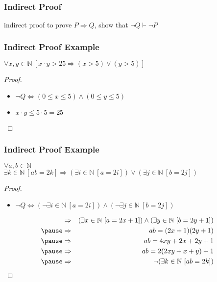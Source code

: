 \documentclass[dvipsnames]{beamer}
\begin{document}
\begin{frame}
  \frametitle{Indirect Proof}

  \begin{block}{indirect proof}
    to prove $P \Rightarrow Q$, show that $\neg Q \vdash \neg P$
  \end{block}
\end{frame}

\begin{frame}
  \frametitle{Indirect Proof Example}

  \begin{theorem}
    $\forall x,y \in \mathbb{N}~[x \cdot y > 25
      \Rightarrow (x > 5) \vee (y > 5)]$
  \end{theorem}

  \pause
  \begin{proof}
    \begin{itemize}
      \item $\neg Q \Leftrightarrow (0 \leq x \leq 5) \wedge (0 \leq y \leq 5)$

      \pause
      \item $x \cdot y \leq 5 \cdot 5 = 25$
    \end{itemize}
  \end{proof}
\end{frame}

\begin{frame}
  \frametitle{Indirect Proof Example}

  \begin{theorem}
    $\forall a,b \in \mathbb{N}$\\
      $\exists k \in \mathbb{N}~[ab=2k] \Rightarrow
        (\exists i \in \mathbb{N}~[a=2i]) \vee
        (\exists j \in \mathbb{N}~[b=2j])$
  \end{theorem}

  \pause
  \begin{proof}
    \begin{itemize}
      \item $\neg Q \Leftrightarrow (\neg \exists i \in \mathbb{N}~[a=2i])
                          \wedge (\neg \exists j \in \mathbb{N}~[b=2j])$
    \end{itemize}

    \pause
    \vspace{-24pt}
    \begin{eqnarray*}
      & \Rightarrow & (\exists x \in \mathbb{N}~[a=2x+1])
               \wedge (\exists y \in \mathbb{N}~[b=2y+1])\\\pause
      & \Rightarrow & ab=(2x+1)(2y+1)\\\pause
      & \Rightarrow & ab=4xy+2x+2y+1\\\pause
      & \Rightarrow & ab=2(2xy+x+y)+1\\\pause
      & \Rightarrow & \neg (\exists k \in \mathbb{N}~[ab=2k])
    \end{eqnarray*}
  \end{proof}
\end{frame}
\end{document}
